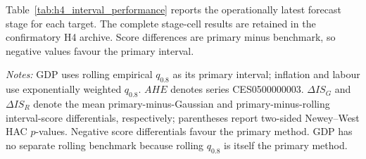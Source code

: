 Table~\ref{tab:h4_interval_performance} reports the operationally latest
forecast stage for each target.  The complete stage-cell results are retained
in the confirmatory H4 archive.  Score differences are primary minus
benchmark, so negative values favour the primary interval.

\begin{table}[H]
\centering
\caption{H4: 80\% predictive intervals at the latest forecast stage}
\label{tab:h4_interval_performance}
\scriptsize
\setlength{\tabcolsep}{2.1pt}
\par\medskip
\begin{minipage}{0.90\textwidth}
\footnotesize
\textit{Notes:} GDP uses rolling empirical \(q_{0.8}\) as its primary interval;
inflation and labour use exponentially weighted \(q_{0.8}\).  \(AHE\)
denotes series CES0500000003.  \(\Delta IS_G\) and \(\Delta IS_R\) denote the
mean primary-minus-Gaussian and primary-minus-rolling interval-score
differentials, respectively; parentheses report two-sided Newey--West HAC
\(p\)-values.  Negative score differentials favour the primary method.
GDP has no separate rolling benchmark because rolling \(q_{0.8}\) is itself
the primary method.
\end{minipage}
\end{table}

